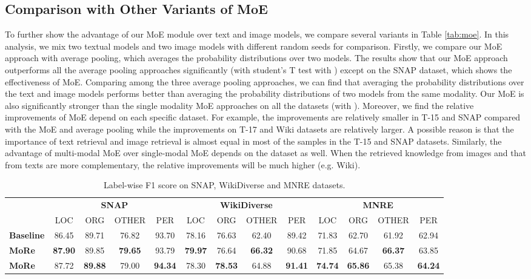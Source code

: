 \documentclass[11pt]{article}
\begin{document}
\subsection{Comparison with Other Variants of MoE}
To further show the advantage of our MoE module over text and image models, we compare several variants in Table \ref{tab:moe}. In this analysis, we mix two textual models and two image models with different random seeds for comparison. Firstly, we compare our MoE approach with average pooling, which averages the probability distributions over two models. The results show that our MoE approach outperforms all the average pooling approaches significantly (with student's T test with ) except on the SNAP dataset, which shows the effectiveness of MoE. Comparing among the three average pooling approaches, we can find that averaging the probability distributions over the text and image models performs better than averaging the probability distributions of two models from the same modality. Our MoE is also significantly stronger than the single modality MoE approaches on all the datasets (with ). 
Moreover, we find the relative improvements of MoE depend on each specific dataset. For example, the improvements are relatively smaller in T-15 and SNAP compared with the MoE and average pooling while the improvements on T-17 and Wiki datasets are relatively larger. A possible reason is that the importance of text retrieval and image retrieval is almost equal in most of the samples in the T-15 and SNAP datasets. Similarly, the advantage of multi-modal MoE over single-modal MoE depends on the dataset as well. When the retrieved knowledge from images and that from texts are more complementary, the relative improvements will be much higher (e.g. Wiki). 


\begin{table*}[t!]
\small
\setlength\tabcolsep{5pt}
\centering
\begin{tabular}{l|cccc|cccc|cccc}
\toprule
 & \multicolumn{4}{c|}{\textbf{SNAP}} & \multicolumn{4}{c|}{\textbf{WikiDiverse}} & \multicolumn{4}{c}{\textbf{MNRE}}\\
  & LOC   & ORG   & OTHER  & PER   & LOC   & ORG   & OTHER & PER   & LOC   & ORG   & OTHER & PER   \\
\midrule
\textbf{Baseline} & 86.45 & 89.71 & 76.82 & 93.70 & 78.16 & 76.63 & 62.40 & 89.42 & 71.83 & 62.70 & 61.92 & 62.94 \\
\textbf{MoRe}  & \textbf{87.90} & 89.85 & \textbf{79.65} & 93.79 & \textbf{79.97} & 76.64 & \textbf{66.32} & 90.68 & 71.85 & 64.67 & \textbf{66.37} & 63.85 \\
\textbf{MoRe} & 87.72 & \textbf{89.88} & 79.00 & \textbf{94.34} & 78.30 & \textbf{78.53} & 64.88 & \textbf{91.41} & \textbf{74.74} & \textbf{65.86} & 65.38 & \textbf{64.24} \\

\bottomrule
\end{tabular}
\caption{Label-wise F1 score on SNAP, WikiDiverse and MNRE datasets.}
\label{tab:labelf1}
\end{table*}
\end{document}
